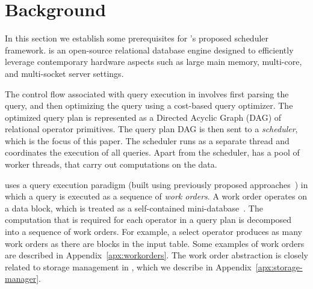 \section{Background}\label{sec:background}
In this section we establish some prerequisites for \sys{}'s proposed scheduler framework.
\sys{} is an open-source relational database engine 
designed to efficiently leverage contemporary hardware aspects such as large main memory, multi-core, and multi-socket server settings. 

The control flow associated with query execution in \sys{} involves first parsing the query, and then optimizing the query using a cost-based query optimizer.
The optimized query plan is represented as a Directed Acyclic Graph (DAG) of relational operator primitives. 
The query plan DAG is then sent to a \textit{scheduler}, which is the focus of this paper. 
The scheduler runs as a separate thread and coordinates the execution of all queries. 
Apart from the scheduler, \sys{} has a pool of worker threads, that carry out computations on the data. 

\sys{} uses a query execution paradigm (built using previously proposed approaches~\cite{qsstorage,morsel}) in which a query is executed as a sequence of \textit{work orders}. 
A work order operates on a data block, which is treated as a self-contained mini-database~\cite{qsstorage}. 
The computation that is required for each operator in a query plan is decomposed into a sequence of work orders. 
For example, a select operator produces as many work orders as there are blocks in the input table. 
Some examples of work orders are described in Appendix~\ref{apx:workorders}.
The work order abstraction is closely related to storage management in \sys{}, which we describe in Appendix~\ref{apx:storage-manager}.